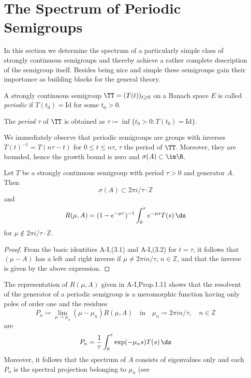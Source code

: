 \section{The Spectrum of Periodic Semigroups}\label{sec:a3-5}
In this section we determine the spectrum of a particularly simple class of strongly continuous semigroups and thereby achieve a rather complete description of the semigroup itself.
Besides being nice and simple these semigroups gain their importance as building blocks for the general theory.

\begin{definition}\label{def:a3-5.1}
A strongly continuous semigroup $\TT = (T(t))_{t \geq 0}$ on a Banach space $E$ is called \emph{periodic} if $T(t_{0}) = \text{Id}$ for some $t_{0} > 0$.

The \emph{period} $\tau$ of $\TT$ is obtained as $\tau \coloneqq \inf\{t_{0} > 0 \colon T(t_{0}) = \text{Id}\}$.
\end{definition}
We immediately observe that periodic semigroups are groups with inverses \\
$T(t)^{-1} = T(n\tau-t)$ for $0 \leq t \leq n\tau$, $\tau$ the period of $\TT$.
Moreover, they are bounded, hence the growth bound is zero and $\sigma(A) \subset \im\R$.

\begin{lemma}\label{lem:a3-5.2}

Let $T$ be a strongly continuous semigroup with period $\tau > 0$ and generator $A$.
Then
\[
\sigma(A) \subset 2\pi i/\tau\cdot\mathbb{Z}
\]
and
\begin{equation}\label{eq:a3-5.1}
R(\mu,A) = (1-e^{-\mu\tau})^{-1} \int_{0}^{\tau}e^{-\mu s}T(s) \, \ds
\end{equation}
for $\mu \notin 2\pi i/\tau\cdot\mathbb{Z}$.
\end{lemma}

\begin{proof}
From the basic identities A-I,(3.1) and A-I,(3.2) for $t = \tau$, it follows that $(\mu - A)$ has a left and right inverse if $\mu \neq 2\pi in/\tau$, $n \in \mathbb{Z}$, and that the inverse is given by the above expression.
\end{proof}

The representation of $R(\mu,A)$ given in A-I,Prop.1.11 shows that the resolvent of the generator of a periodic semigroup is a meromorphic function having only poles of order one and the residues
\[
P_{n} \coloneqq \lim_{\mu \to \mu_{n}} (\mu-\mu_{n})R(\mu,A) \quad \text{in} \quad \mu_{n} \coloneqq 2\pi in/\tau, \quad n \in \mathbb{Z}
\]
are
\begin{equation}\label{eq:a3-5.2}
P_{n} = \frac{1}{\tau}\int_{0}^{\tau}\exp(-\mu_{n}s)T(s) \, \ds
\end{equation}
Moreover, it follows that the spectrum of $A$ consists of eigenvalues only and each $P_{n}$ is the spectral projection belonging to $\mu_{n}$ (see



